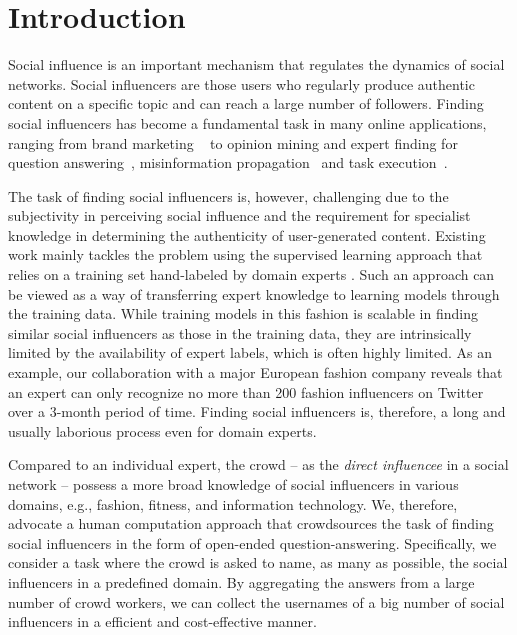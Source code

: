 \section{Introduction}

Social influence is an important mechanism that regulates the dynamics of social networks. Social influencers are those users who regularly produce authentic content on a specific topic and can reach a large number of followers. Finding social influencers has become a fundamental task in many online applications, ranging from brand marketing
~\cite{bond201261,richardson2002mining,van2007new} to opinion mining \cite{pang2008opinion,li2012mining} and expert finding for question 
answering~\cite{riahi2012finding}, misinformation propagation~\cite{DBLP:conf/icde/SongHL17} and task execution~\cite{sun2014analyzing,miao2010generative}.  

The task of finding social influencers is, however, challenging due to the subjectivity in perceiving social influence and the requirement for specialist knowledge in determining the authenticity of user-generated content. Existing work mainly tackles the problem using the supervised learning approach that relies on a training set hand-labeled by domain experts \cite{Cheng2014,Lehmann2013,wei2016learning}.  Such an approach can be viewed as a way of transferring expert knowledge to learning models through the training data. While training models in this fashion is scalable in finding similar social influencers as those in the training data, they are intrinsically limited by the availability of expert labels, which is often highly limited. As an example, our collaboration with a major European fashion company reveals that an expert can only recognize no more than 200 fashion influencers on Twitter over a 3-month period of time. Finding social influencers is, therefore, a long and usually laborious process even for domain experts.

Compared to an individual expert, the crowd -- as the \emph{direct influencee} in a social network -- possess a more broad knowledge of social influencers in various domains, e.g., fashion, fitness, and information technology. We, therefore, advocate a human computation approach that crowdsources the task of finding social influencers in the form of open-ended question-answering. Specifically, we consider a task where the crowd is asked to name, as many as possible, the social influencers in a predefined domain. By aggregating the answers from a large number of crowd workers, we can collect the usernames of a big number of social influencers in a efficient and cost-effective manner. 


